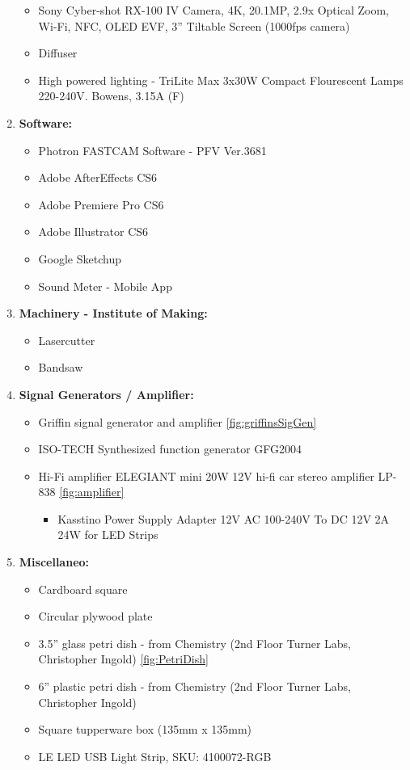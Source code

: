 \begin{enumerate}
\begin{itemize}
\item Sony Cyber-shot RX-100 IV Camera, 4K, 20.1MP, 2.9x Optical Zoom, Wi-Fi, NFC, OLED EVF, 3'' Tiltable Screen (1000fps camera)
\item Diffuser
\item High powered lighting - TriLite Max 3x30W Compact Flourescent Lamps 220-240V. Bowens, 3.15A (F)
\end{itemize}
\item \textbf{Software:}

\begin{itemize}
\item Photron FASTCAM Software - PFV Ver.3681
\item Adobe AfterEffects CS6
\item Adobe Premiere Pro CS6
\item Adobe Illustrator CS6
\item Google Sketchup
\item Sound Meter - Mobile App
\end{itemize}
\item \textbf{Machinery - Institute of Making:}

\begin{itemize}
\item Lasercutter
\item Bandsaw
\end{itemize}

\item \textbf{Signal Generators / Amplifier:}

\begin{itemize}
\item Griffin signal generator and amplifier \ref{fig:griffinsSigGen}
\item ISO-TECH Synthesized function generator GFG2004 
\item Hi-Fi amplifier ELEGIANT mini 20W 12V hi-fi car stereo amplifier LP-838 \ref{fig:amplifier}

\begin{itemize}
\item Kasstino Power Supply Adapter 12V AC 100-240V To DC 12V 2A 24W for LED Strips
\end{itemize}
\end{itemize}
\item \textbf{Miscellaneo:}

\begin{itemize}
\item Cardboard square
\item Circular plywood plate
\item 3.5'' glass petri dish - from Chemistry (2nd Floor Turner Labs, Christopher Ingold) \ref{fig:PetriDish}
\item 6'' plastic petri dish - from Chemistry (2nd Floor Turner Labs, Christopher Ingold)
\item Square tupperware box (135mm x 135mm)
\item LE LED USB Light Strip, SKU: 4100072-RGB


\end{itemize}
\end{enumerate}
